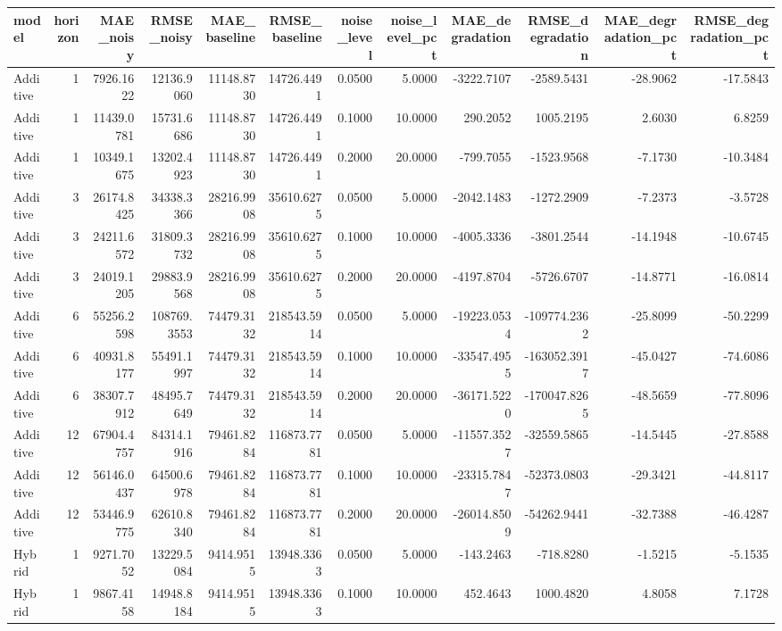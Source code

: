 \begin{tabular}{lrrrrrrrrrrr}
\toprule
model & horizon & MAE_noisy & RMSE_noisy & MAE_baseline & RMSE_baseline & noise_level & noise_level_pct & MAE_degradation & RMSE_degradation & MAE_degradation_pct & RMSE_degradation_pct \\
\midrule
Additive & 1 & 7926.1622 & 12136.9060 & 11148.8730 & 14726.4491 & 0.0500 & 5.0000 & -3222.7107 & -2589.5431 & -28.9062 & -17.5843 \\
Additive & 1 & 11439.0781 & 15731.6686 & 11148.8730 & 14726.4491 & 0.1000 & 10.0000 & 290.2052 & 1005.2195 & 2.6030 & 6.8259 \\
Additive & 1 & 10349.1675 & 13202.4923 & 11148.8730 & 14726.4491 & 0.2000 & 20.0000 & -799.7055 & -1523.9568 & -7.1730 & -10.3484 \\
Additive & 3 & 26174.8425 & 34338.3366 & 28216.9908 & 35610.6275 & 0.0500 & 5.0000 & -2042.1483 & -1272.2909 & -7.2373 & -3.5728 \\
Additive & 3 & 24211.6572 & 31809.3732 & 28216.9908 & 35610.6275 & 0.1000 & 10.0000 & -4005.3336 & -3801.2544 & -14.1948 & -10.6745 \\
Additive & 3 & 24019.1205 & 29883.9568 & 28216.9908 & 35610.6275 & 0.2000 & 20.0000 & -4197.8704 & -5726.6707 & -14.8771 & -16.0814 \\
Additive & 6 & 55256.2598 & 108769.3553 & 74479.3132 & 218543.5914 & 0.0500 & 5.0000 & -19223.0534 & -109774.2362 & -25.8099 & -50.2299 \\
Additive & 6 & 40931.8177 & 55491.1997 & 74479.3132 & 218543.5914 & 0.1000 & 10.0000 & -33547.4955 & -163052.3917 & -45.0427 & -74.6086 \\
Additive & 6 & 38307.7912 & 48495.7649 & 74479.3132 & 218543.5914 & 0.2000 & 20.0000 & -36171.5220 & -170047.8265 & -48.5659 & -77.8096 \\
Additive & 12 & 67904.4757 & 84314.1916 & 79461.8284 & 116873.7781 & 0.0500 & 5.0000 & -11557.3527 & -32559.5865 & -14.5445 & -27.8588 \\
Additive & 12 & 56146.0437 & 64500.6978 & 79461.8284 & 116873.7781 & 0.1000 & 10.0000 & -23315.7847 & -52373.0803 & -29.3421 & -44.8117 \\
Additive & 12 & 53446.9775 & 62610.8340 & 79461.8284 & 116873.7781 & 0.2000 & 20.0000 & -26014.8509 & -54262.9441 & -32.7388 & -46.4287 \\
Hybrid & 1 & 9271.7052 & 13229.5084 & 9414.9515 & 13948.3363 & 0.0500 & 5.0000 & -143.2463 & -718.8280 & -1.5215 & -5.1535 \\
Hybrid & 1 & 9867.4158 & 14948.8184 & 9414.9515 & 13948.3363 & 0.1000 & 10.0000 & 452.4643 & 1000.4820 & 4.8058 & 7.1728 \\

\end{tabular}
